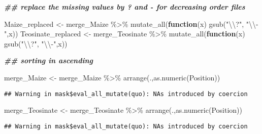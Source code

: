 \documentclass[
]{article}
\newenvironment{Shaded}{\begin{snugshade}}{\end{snugshade}}
\newcommand{\CommentTok}[1]{\textcolor[rgb]{0.56,0.35,0.01}{\textit{#1}}}
\newcommand{\ControlFlowTok}[1]{\textcolor[rgb]{0.13,0.29,0.53}{\textbf{#1}}}
\newcommand{\DocumentationTok}[1]{\textcolor[rgb]{0.56,0.35,0.01}{\textbf{\textit{#1}}}}
\newcommand{\FunctionTok}[1]{\textcolor[rgb]{0.00,0.00,0.00}{#1}}
\newcommand{\NormalTok}[1]{#1}
\newcommand{\OtherTok}[1]{\textcolor[rgb]{0.56,0.35,0.01}{#1}}
\newcommand{\SpecialCharTok}[1]{\textcolor[rgb]{0.00,0.00,0.00}{#1}}
\newcommand{\StringTok}[1]{\textcolor[rgb]{0.31,0.60,0.02}{#1}}
\begin{document}
\begin{Shaded}
\begin{Highlighting}[]
\DocumentationTok{\#\# replace the missing values by ? and {-} for decreasing order files}

\NormalTok{Maize\_replaced }\OtherTok{\textless{}{-}}\NormalTok{ merge\_Maize }\SpecialCharTok{\%\textgreater{}\%} \FunctionTok{mutate\_all}\NormalTok{(}\ControlFlowTok{function}\NormalTok{(x) }\FunctionTok{gsub}\NormalTok{(}\StringTok{"}\SpecialCharTok{\textbackslash{}\textbackslash{}}\StringTok{?"}\NormalTok{, }\StringTok{"}\SpecialCharTok{\textbackslash{}\textbackslash{}}\StringTok{{-}"}\NormalTok{,x))}
\NormalTok{Teosinate\_replaced }\OtherTok{\textless{}{-}}\NormalTok{ merge\_Teosinate }\SpecialCharTok{\%\textgreater{}\%} \FunctionTok{mutate\_all}\NormalTok{(}\ControlFlowTok{function}\NormalTok{(x) }\FunctionTok{gsub}\NormalTok{(}\StringTok{"}\SpecialCharTok{\textbackslash{}\textbackslash{}}\StringTok{?"}\NormalTok{, }\StringTok{"}\SpecialCharTok{\textbackslash{}\textbackslash{}}\StringTok{{-}"}\NormalTok{,x))}

\DocumentationTok{\#\# sorting in ascending }

\NormalTok{merge\_Maize }\OtherTok{\textless{}{-}}\NormalTok{ merge\_Maize }\SpecialCharTok{\%\textgreater{}\%} \FunctionTok{arrange}\NormalTok{(.,}\FunctionTok{as.numeric}\NormalTok{(Position))}
\end{Highlighting}
\end{Shaded}

\begin{verbatim}
## Warning in mask$eval_all_mutate(quo): NAs introduced by coercion
\end{verbatim}

\begin{Shaded}
\begin{Highlighting}[]
\NormalTok{merge\_Teosinate }\OtherTok{\textless{}{-}}\NormalTok{ merge\_Teosinate }\SpecialCharTok{\%\textgreater{}\%} \FunctionTok{arrange}\NormalTok{(.,}\FunctionTok{as.numeric}\NormalTok{(Position))}
\end{Highlighting}
\end{Shaded}

\begin{verbatim}
## Warning in mask$eval_all_mutate(quo): NAs introduced by coercion
\end{verbatim}

\begin{Shaded}
\end{Shaded}
\end{document}

